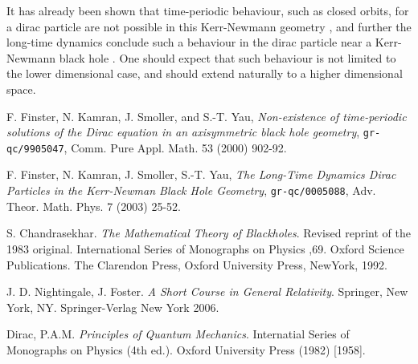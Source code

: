 \documentclass[12pt]{article}
\begin{document}
It has already been shown that time-periodic behaviour, such as closed orbits, for a dirac particle are not possible in this Kerr-Newmann geometry \cite{cpam}, and further the long-time dynamics conclude such a behaviour in the dirac particle near a Kerr-Newmann black hole \cite{atmp}. One should expect that such behaviour is not limited to the lower dimensional case, and should extend naturally to a higher dimensional space. 


\newpage
\begin{thebibliography}{9}
  F. Finster, N. Kamran, J. Smoller, and S.-T. Yau, \textit{Non-existence of time-periodic solutions of the Dirac equation in an axisymmetric black hole geometry}, \texttt{gr-qc/9905047}, Comm. Pure Appl. Math. 53 (2000) 902-92.

  F. Finster, N. Kamran, J. Smoller, S.-T. Yau, \textit{The Long-Time Dynamics Dirac Particles in the Kerr-Newman Black Hole Geometry}, \texttt{gr-qc/0005088}, Adv. Theor. Math. Phys. 7 (2003) 25-52.

  S. Chandrasekhar. \textit{The Mathematical Theory of Blackholes}. Revised reprint of the 1983 original. International Series of Monographs on Physics ,69. Oxford Science Publications. The Clarendon Press, Oxford University Press, NewYork, 1992.	

  J. D. Nightingale, J. Foster. \textit{A Short Course in General Relativity}. Springer, New York, NY. Springer-Verlag New York 2006.

  Dirac, P.A.M. \textit{Principles of Quantum Mechanics}. Internatial Series of Monographs on Physics (4th ed.). Oxford University Press (1982) [1958].
  
\end{thebibliography}
\end{document}
